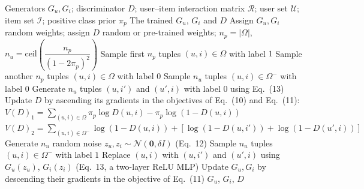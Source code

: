 \documentclass{article}
\begin{document}
\begin{algorithm}[!h]
\renewcommand{\algorithmicrequire}{\textbf{Input:}}
\renewcommand{\algorithmicensure}{\textbf{Output:}}
	\caption{PURE: positive-unlabeled recommendation with a generative adversarial network}
	\begin{algorithmic}[1]
	    \REQUIRE
	    Generators $G_{u},G_{i}$; discriminator $D$; user--item interaction matrix $\mathcal{R}$;
	    user set $\mathcal{U}$; item set $\mathcal{I}$; positive class prior $\pi_{p}$
	    \ENSURE
	    The trained $G_{u}$, $G_{i}$ and $D$
	    \STATE Assign $G_{u},G_{i}$ random weights; assign $D$ random or pre-trained weights;
	    $n_{p}=|\Omega|$,\quad $n_{u}=\mathrm{ceil}\!\left(\dfrac{n_{p}}{(1-2\pi_{p})^{2}}\right)$ %
	    \REPEAT
	    \STATE Sample first $n_{p}$ tuples $(u,i)\in\Omega$ with label $1$
	    \STATE Sample another $n_{p}$ tuples $(u,i)\in\Omega$ with label $0$ %
	    \STATE Sample $n_{u}$ tuples $(u,i)\in\Omega^{-}$ with label $0$
	    \STATE Generate $n_{u}$ tuples $(u,i')$ and $(u',i)$ with label $0$ using Eq.~(13)
	    \STATE Update $D$ by ascending its gradients in the objectives of Eq.~(10) and Eq.~(11):
	    \STATE \quad $V(D)_{1}=\sum_{(u,i)\in\Omega}\pi_{p}\log D(u,i)-\pi_{p}\log\!\left(1-D(u,i)\right)$
	    \STATE \quad $V(D)_{2}=\sum_{(u,i)\in\Omega^{-}}\log\!\left(1-D(u,i)\right)
	    +\left[\log\!\left(1-D(u,i')\right)+\log\!\left(1-D(u',i)\right)\right]$
	    \ENDFOR
	    \STATE Generate $n_{u}$ random noise $z_{u},z_{i}\sim\mathcal{N}(\mathbf{0},\delta I)$ (Eq.~12)
	    \STATE Sample $n_{u}$ tuples $(u,i)\in\Omega^{-}$ with label $1$
	    \STATE Replace $(u,i)$ with $(u,i')$ and $(u',i)$ using $G_{u}(z_{u})$, $G_{i}(z_{i})$ (Eq.~13,
	    a two-layer ReLU MLP) %
	    \STATE Update $G_{u},G_{i}$ by descending their gradients in the objective of Eq.~(11)
	    \ENDFOR
		\RETURN $G_{u}$, $G_{i}$, $D$
	\end{algorithmic}
\end{algorithm}
\end{document}
